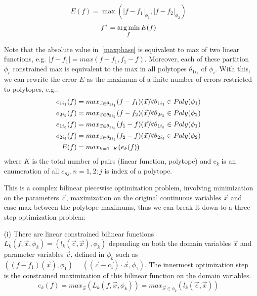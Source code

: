 \begin{equation} E(f) = \max ( |f - f_1|_{\phi_1} , |f - f_2|_{\phi_2} ) \label{maxphase} \end{equation}
\begin{equation} f^* = \argmin_f E(f)  \label{minphase} \end{equation}

Note that the absolute value in~\ref{maxphase} is equivalent to max of two linear functions, e.g. $|f - f_1| = max ( f - f_1, f_1 - f)$. Moreover, each of these partition $\phi_i$ constrained max is equivalent to the max in all polytopes $\theta_{1{i_1}}$ of $\phi_i$. With this, we can rewrite the error $E$ as the maximum of a finite number of errors restricted to polytopes, e.g.:
{%
\begin{align}
\footnotesize
 e_{1{i_1}}(f) &= max_{\vec{x} \in \theta_{1{i_1}}} (f - f_1)(\vec{x}) \forall \theta_{1{i_1}} \in Poly(\phi_1) \nonumber\\
 e_{2{i_2}}(f) &= max_{\vec{x} \in \theta_{2{i_2}}} (f - f_2)(\vec{x}) \forall \theta_{2{i_2}} \in Poly(\phi_2) \nonumber\\
 e_{1{i_3}}(f) &= max_{\vec{x} \in \theta_{1{i_3}}} (f_1 - f)(\vec{x}) \forall \theta_{1{i_3}} \in Poly(\phi_1) \nonumber\\
 e_{2{i_4}}(f) &= max_{\vec{x} \in \theta_{2{i_4}}} (f_2 - f)(\vec{x}) \forall \theta_{2{i_4}} \in Poly(\phi_2)\nonumber\\
E(f) &= max_{k=1..K} (e_k(f)) \nonumber
\end{align}
where $K$ is the total number of pairs (linear function, polytope)  and e$ _k$ is an enumeration of all $e_{nj}, n = 1,2; j $ is index of a polytope.
}

This is a complex bilinear piecewise optimization problem, involving minimization on the parameters $\vec{c}$, maximization on the original continuous variables $\vec{x}$ and case max between the polytope maximums, thus we can break it down to a three step optimization problem: 

(i) There are linear constrained bilinear functions $L_{k}(f,\vec{x},\phi_k) =  ( l_k(\vec{c},\vec{x}) ,\phi_k)$ depending on both the domain variables $\vec{x}$ and parameter variables $\vec{c}$, defined in $\phi_k$ such as $ ( (f - f_1)(\vec{x}),\phi_1) = ( (\vec{c}-\vec{c_1})\cdot\vec{x}, \phi_1)$. The innermost optimization step is the constrained maximization of this bilinear function on the domain variables.
\begin{equation} e_k(f) = max_{\vec{x}} ( L_k(f,\vec{x},\phi_k) ) = max_{ {\vec{x}} \in \phi_k} (l_k (\vec{c}, \vec{x}) ) \label{step1} \nonumber \end{equation}

